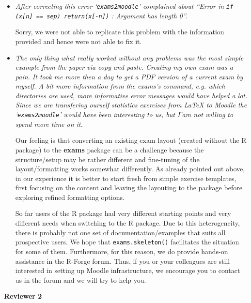 \documentclass[a4paper]{article}
\begin{document}
\begin{itemize}
Yes, the error message was too opaque. The new version of exams now reports
the following error: `no \verb|\exsolution{}| specified'

\item {\it
After correcting this error `\texttt{exams2moodle}' complained about ``Error in
\texttt{if (x[n] == sep) return(x[-n])} : Argument has length 0''.}

Sorry, we were not able to replicate this problem with the information provided
and hence were not able to fix it.

\item {\it
The only thing what really worked without any problems was the most simple
example from the paper via copy and paste.  Creating my own exam was a pain. 
It took me more then a day to get a PDF version of a current exam by myself. 
A bit more information from the exams's command, e.g.  which directories are
used, more informative error messages would have helped a lot.  Since we are
transfering ourself statistics exercises from {\LaTeX} to Moodle the
`\texttt{exams2moodle}' would have been interesting to us, but I'am not willing to
spend more time on it.}

Our feeling is that converting an existing exam layout (created without
the R package) to the \textbf{exams} package can be a challenge because the structure/setup
may be rather different and fine-tuning of the layout/formatting works somewhat
differently. As already pointed out above, in our experience it is better to
start fresh from simple exercise templates, first focusing on the content and leaving the layouting to
the package before exploring refined formatting options.

So far users of the R package had very different starting points and very different
needs when switching to the R package. Due to this heterogeneity, there is
probably not one set of documentation/examples that suits all prospective users.
We hope that \texttt{exams.skeleton()} facilitates the situation for some of them.
Furthermore, for this reason, we do provide hands-on assistance in the R-Forge
forum. Thus, if you or your colleagues are still interested in setting up
Moodle infrastructure, we encourage you to contact us in the forum and we will
try to help you.

\end{itemize}

\bigskip

\textbf{\Large Reviewer 2}

\medskip
\end{document}
